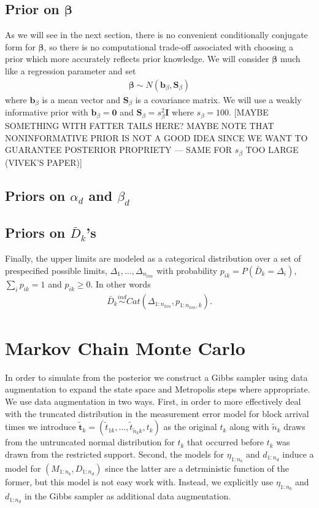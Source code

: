 \documentclass{article}
\begin{document}
\subsection{Prior on $\bm{\beta}$}
As we will see in the next section, there is no convenient conditionally conjugate form for $\bm{\beta}$, so there is no computational trade-off associated with choosing a prior which more accurately reflects prior knowledge. We will consider $\bm{\beta}$ much like a regression parameter and set
\begin{align*}
\bm{\beta} \sim N(\bm{b}_\beta, \bm{S}_\beta)
\end{align*}
where $\bm{b}_\beta$ is a mean vector and $\bm{S}_\beta$ is a covariance matrix. We will use a weakly informative prior with $\bm{b}_\beta = \bm{0}$ and $\bm{S}_\beta = s^2_\beta\bm{I}$ where $s_\beta = 100$.  [MAYBE SOMETHING WITH FATTER TAILS HERE? MAYBE NOTE THAT NONINFORMATIVE PRIOR IS NOT A GOOD IDEA SINCE WE WANT TO GUARANTEE POSTERIOR PROPRIETY --- SAME FOR $s_\beta$ TOO LARGE (VIVEK'S PAPER)]

\subsection{Priors on $\alpha_d$ and $\beta_d$}

\subsection{Priors on $\bar{D}_k$'s}

Finally, the upper limits are modeled as a categorical distribution over a set of prespecified possible limits, $\Delta_1,\dots,\Delta_{n_{lim}}$ with probability $p_{ik} = P(\bar{D}_k = \Delta_i)$, $\sum_ip_{ik} = 1$ and $p_{ik} \ge 0$. In other words
\begin{align*}
\bar{D}_k\stackrel{ind}{\sim} Cat(\Delta_{1:n_{lim}}, p_{1:n_{lim},k}).
\end{align*}

\section{Markov Chain Monte Carlo}\label{sec:mcmc}

In order to simulate from the posterior we construct a Gibbs sampler using data augmentation to expand the state space and Metropolis steps where appropriate. We use data augmentation in two ways. First, in order to more effectively deal with the truncated distribution in the measurement error model for block arrival times we introduce $\tilde{\bm{t}}_k=(\tilde{t}_{1k},\dots,\tilde{t}_{\tilde{n}_kk}, t_k)$ as the original $t_k$ along with $\tilde{n}_k$ draws from the untruncated normal distribution for $t_k$ that occurred before $t_k$ was drawn from the restricted support. Second, the models for $\eta_{1:n_{b}}$ and $d_{1:n_d}$ induce a model for $(M_{1:n_{b}},D_{1:n_d})$ since the latter are a detrministic function of the former, but this model is not easy work with. Instead, we explicitly use $\eta_{1:n_{b}}$ and $d_{1:n_d}$ in the Gibbs sampler as additional data augmentation.
\end{document}
